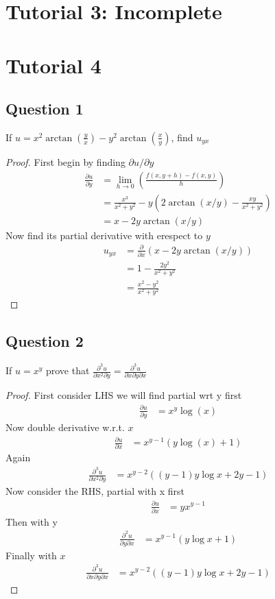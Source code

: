\documentclass[oneside,11pt,pdftex]{book}%
\numberwithin{section}{chapter}
\numberwithin{equation}{chapter}
\begin{document}
\chapter{Tutorial 3: Incomplete}
\chapter{Tutorial 4}
\section{Question 1}
If $ u=x^2 \arctan \left( \frac{y}{x}\right) -y^2 \arctan \left( \frac{x}{y}\right)$, find $ u_{yx} $
\begin{proof}
	First begin by finding $ \partial u/ \partial y $
	\begin{align*}
		\frac{\partial u}{\partial y}&=\lim_{h \rightarrow 0} \left( \frac{f(x,y+h)-f(x,y)}{h}\right)\\
		&=\frac{x^3}{x^2+y^2}-y\left(2 \arctan(x/y)-\frac{xy}{x^2+y^2}\right)\\
		&=x-2y \arctan(x/y)
	\end{align*}
	Now find its partial derivative with erespect to $ y $
	\begin{align*}
		u_{yx}&=\frac{\partial }{\partial x} (x-2y \arctan(x/y))\\
		&=1-\frac{2y^2}{x^2+y^2}\\
		&=\frac{x^2-y^2}{x^2+y^2}
	\end{align*}
\end{proof}

\section{Question 2}
If $ u=x^y $ prove that $ \frac{\partial^3 u}{\partial x^2 \partial y} = \frac{\partial^3 u}{\partial x \partial y \partial x}$
\begin{proof}
	First consider LHS we will find partial wrt y first
	\begin{align*}
		\frac{\partial u }{\partial y}&=x^y \log(x)
	\end{align*}
	Now double derivative w.r.t. $ x $
	\begin{align*}
		\frac{\partial u}{\partial x}&= x^{y-1}(y \log(x)+1)
	\end{align*}
	Again
	\begin{align*}
		\frac{\partial^3 u}{\partial x^2 \partial y}&=x^{y-2}((y-1)y \log x + 2y-1)
	\end{align*}
	Now consider the RHS,
	partial with x first
	\begin{align*}
		\frac{\partial u}{\partial x}&=yx^{y-1}
	\end{align*}
	Then with y
	\begin{align*}
		\frac{\partial^2 u}{\partial y \partial x}&=x^{y-1}(y \log x +1 )
	\end{align*}
	Finally with $ x $
	\begin{align*}
		\frac{\partial^3 u}{\partial x \partial y  \partial x}&=x^{y-2}((y-1)y \log x + 2y-1)
	\end{align*}
\end{proof}
\end{document}
